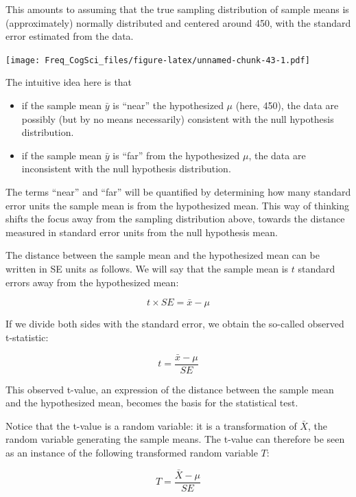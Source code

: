 \documentclass[12pt,]{krantz}
\providecommand{\tightlist}{%
  \setlength{\itemsep}{0pt}\setlength{\parskip}{0pt}}
\begin{document}
This amounts to assuming that the true sampling distribution of sample means is (approximately) normally distributed and centered around 450, with the standard error estimated from the data.

\texttt{[image: Freq\_CogSci\_files/figure-latex/unnamed-chunk-43-1.pdf]}

The intuitive idea here is that

\begin{itemize}
\tightlist
\item
  if the sample mean \(\bar{y}\) is ``near'' the hypothesized \(\mu\) (here, 450), the data are possibly (but by no means necessarily) consistent with the null hypothesis distribution.
\item
  if the sample mean \(\bar{y}\) is ``far'' from the hypothesized \(\mu\), the data are inconsistent with the null hypothesis distribution.
\end{itemize}

The terms ``near'' and ``far'' will be quantified by determining how many standard error units the sample mean is from the hypothesized mean. This way of thinking shifts the focus away from the sampling distribution above, towards the distance measured in standard error units from the null hypothesis mean.

The distance between the sample mean and the hypothesized mean can be written in SE units as follows. We will say that the sample mean is \(t\) standard errors away from the hypothesized mean:

\begin{equation}
t \times SE = \bar{x} - \mu 
\end{equation}

If we divide both sides with the standard error, we obtain the so-called observed t-statistic:

\begin{equation}
t  = \frac{\bar{x} - \mu}{SE}
\end{equation}

This observed t-value, an expression of the distance between the sample mean and the hypothesized mean, becomes the basis for the statistical test.

Notice that the t-value is a random variable: it is a transformation of \(\bar{X}\), the random variable generating the sample means. The t-value can therefore be seen as an instance of the following transformed random variable \(T\):

\begin{equation}
T  = \frac{\bar{X} - \mu}{SE}
\end{equation}
\end{document}
